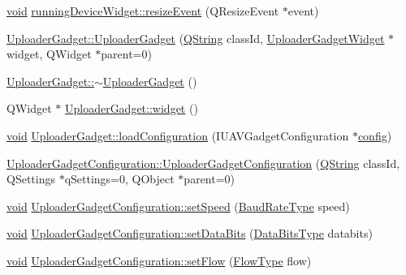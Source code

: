 \begin{DoxyCompactItemize}
\item 
\hyperlink{group___u_a_v_objects_plugin_ga444cf2ff3f0ecbe028adce838d373f5c}{void} \hyperlink{group___y_modem_uploader_ga66507a40f24abba397ae6ea6407a8d2c}{running\-Device\-Widget\-::resize\-Event} (Q\-Resize\-Event $\ast$event)
\item 
\hyperlink{group___y_modem_uploader_ga900f8a9e862c018370d1fa4331b55b12}{Uploader\-Gadget\-::\-Uploader\-Gadget} (\hyperlink{group___u_a_v_objects_plugin_gab9d252f49c333c94a72f97ce3105a32d}{Q\-String} class\-Id, \hyperlink{class_uploader_gadget_widget}{Uploader\-Gadget\-Widget} $\ast$widget, Q\-Widget $\ast$parent=0)
\item 
\hyperlink{group___y_modem_uploader_ga8337b51a0e1630ae11e7ce9f5a9394b9}{Uploader\-Gadget\-::$\sim$\-Uploader\-Gadget} ()
\item 
Q\-Widget $\ast$ \hyperlink{group___y_modem_uploader_gac00d0fe0b9af2cb55ca33b6f0b3ab181}{Uploader\-Gadget\-::widget} ()
\item 
\hyperlink{group___u_a_v_objects_plugin_ga444cf2ff3f0ecbe028adce838d373f5c}{void} \hyperlink{group___y_modem_uploader_gada75c57a2323cdfbb4d0e349d223b1a3}{Uploader\-Gadget\-::load\-Configuration} (I\-U\-A\-V\-Gadget\-Configuration $\ast$\hyperlink{deflate_8c_a4473b5227787415097004fd39f55185e}{config})
\item 
\hyperlink{group___y_modem_uploader_ga1c78df01d106cba6d5b3cb6103df5588}{Uploader\-Gadget\-Configuration\-::\-Uploader\-Gadget\-Configuration} (\hyperlink{group___u_a_v_objects_plugin_gab9d252f49c333c94a72f97ce3105a32d}{Q\-String} class\-Id, Q\-Settings $\ast$q\-Settings=0, Q\-Object $\ast$parent=0)
\item 
\hyperlink{group___u_a_v_objects_plugin_ga444cf2ff3f0ecbe028adce838d373f5c}{void} \hyperlink{group___y_modem_uploader_ga44c9e2b2f4fc691f67440a125a0d3466}{Uploader\-Gadget\-Configuration\-::set\-Speed} (\hyperlink{qextserialport_8h_a6f031169a6a9b150b5af707bb23cf010}{Baud\-Rate\-Type} speed)
\item 
\hyperlink{group___u_a_v_objects_plugin_ga444cf2ff3f0ecbe028adce838d373f5c}{void} \hyperlink{group___y_modem_uploader_ga1da0d34ca3a5840687f53cdb4da50992}{Uploader\-Gadget\-Configuration\-::set\-Data\-Bits} (\hyperlink{qextserialport_8h_a189ef78c2c1b7537ab114d576f6214fa}{Data\-Bits\-Type} databits)
\item 
\hyperlink{group___u_a_v_objects_plugin_ga444cf2ff3f0ecbe028adce838d373f5c}{void} \hyperlink{group___y_modem_uploader_ga69e8d13e1ed2fc41872ecf7c5447aa8b}{Uploader\-Gadget\-Configuration\-::set\-Flow} (\hyperlink{qextserialport_8h_a02ad1c7cf791a069dd54e409f8db4790}{Flow\-Type} flow)

\end{DoxyCompactItemize}
